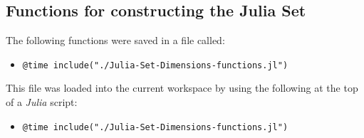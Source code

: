 \documentclass[a4paper,11pt,twoside]{article}
\begin{document}
\subsection{Functions for constructing the Julia Set}
\label{julia-set-functions-script}
The following functions were saved in a file called:

\begin{itemize}
\item \texttt{@time include("./Julia-Set-Dimensions-functions.jl")}
\end{itemize}

This file was loaded into the current workspace by using the following at the top of a \emph{Julia} script:

\begin{itemize}
\item \texttt{@time include("./Julia-Set-Dimensions-functions.jl")}
\end{itemize}
\end{document}
